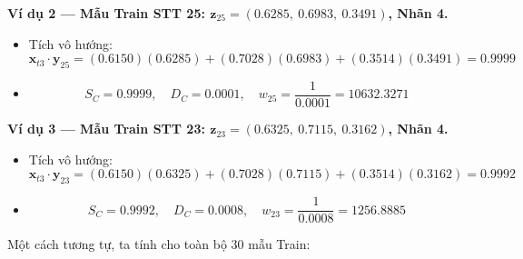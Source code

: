 \documentclass[12pt,a4paper]{article}
\begin{document}
\textbf{Ví dụ 2 — Mẫu Train STT 25: $\mathbf{z}_{25} = (0.6285,\ 0.6983,\ 0.3491)$, Nhãn 4.}
\begin{itemize}
    \item Tích vô hướng:
    \[
        \mathbf{x}_{t3} \cdot \mathbf{y}_{25}
        = (0.6150)(0.6285) + (0.7028)(0.6983) + (0.3514)(0.3491) = 0.9999
    \]
    \item
    \[
        S_C = 0.9999, \quad D_C = 0.0001, \quad
        w_{25} = \frac{1}{0.0001} = 10632.3271
    \]
\end{itemize}
 
\textbf{Ví dụ 3 — Mẫu Train STT 23: $\mathbf{z}_{23} = (0.6325,\ 0.7115,\ 0.3162)$, Nhãn 4.}
\begin{itemize}
    \item Tích vô hướng:
    \[
        \mathbf{x}_{t3} \cdot \mathbf{y}_{23}
        = (0.6150)(0.6325) + (0.7028)(0.7115) + (0.3514)(0.3162) = 0.9992
    \]
    \item
    \[
        S_C = 0.9992, \quad D_C = 0.0008, \quad
        w_{23} = \frac{1}{0.0008} = 1256.8885
    \]
\end{itemize}
 
Một cách tương tự, ta tính cho toàn bộ 30 mẫu Train:
 
\end{document}
